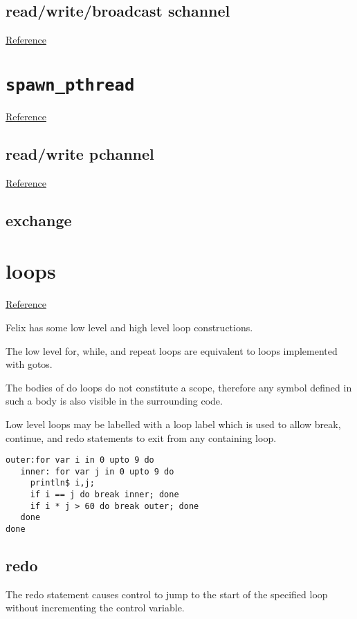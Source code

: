 \documentclass[oneside]{book}
\begin{document}
{\subsection{read/write/broadcast schannel}
\href{http://felix-lang.org/share/lib/std/control/schannels.flx}{Reference}

\section{{\tt spawn\_pthread}}
\href{http://felix-lang.org/share/lib/std/control/pthread.flx}{Reference}

\subsection{read/write pchannel}
\href{http://felix-lang.org/share/lib/std/control/pchannels.flx}{Reference}

\subsection{exchange}

\section{loops}
\href{http://felix-lang.org/share/lib/grammar/loops.fsyn}{Reference}

Felix has some low level and high level loop constructions.

The low level for, while, and repeat loops are equivalent
to loops implemented with gotos.

The bodies of do loops do not constitute a scope,
therefore any symbol defined in such a body is also visible
in the surrounding code.

Low level loops may be labelled with a loop label
which is used to allow break, continue, and redo
statements to exit from any containing loop.


\begin{verbatim}
outer:for var i in 0 upto 9 do
   inner: for var j in 0 upto 9 do
     println$ i,j;
     if i == j do break inner; done
     if i * j > 60 do break outer; done
   done
done
\end{verbatim}


\subsection{redo}
The redo statement causes control to jump to the start
of the specified loop without incrementing the control variable.

}
\end{document}
